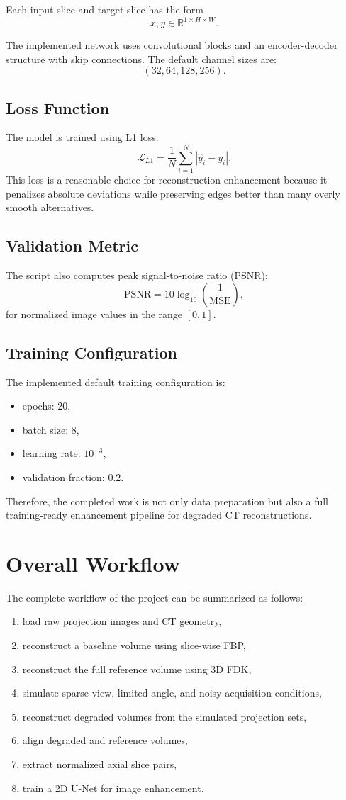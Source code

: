 \documentclass[12pt,a4paper]{article}
\begin{document}
Each input slice and target slice has the form
\[
x,y \in \mathbb{R}^{1\times H\times W}.
\]

The implemented network uses convolutional blocks and an encoder-decoder structure with skip connections. The default channel sizes are:
\[
(32, 64, 128, 256).
\]

\subsection{Loss Function}
The model is trained using L1 loss:
\[
\mathcal{L}_{L1} = \frac{1}{N}\sum_{i=1}^{N}\left|\hat{y}_i-y_i\right|.
\]
This loss is a reasonable choice for reconstruction enhancement because it penalizes absolute deviations while preserving edges better than many overly smooth alternatives.

\subsection{Validation Metric}
The script also computes peak signal-to-noise ratio (PSNR):
\[
\text{PSNR}=10\log_{10}\left(\frac{1}{\text{MSE}}\right),
\]
for normalized image values in the range $[0,1]$.

\subsection{Training Configuration}
The implemented default training configuration is:
\begin{itemize}[leftmargin=*]
\item epochs: 20,
\item batch size: 8,
\item learning rate: $10^{-3}$,
\item validation fraction: 0.2.
\end{itemize}

Therefore, the completed work is not only data preparation but also a full training-ready enhancement pipeline for degraded CT reconstructions.

\section{Overall Workflow}
The complete workflow of the project can be summarized as follows:
\begin{enumerate}[leftmargin=*]
\item load raw projection images and CT geometry,
\item reconstruct a baseline volume using slice-wise FBP,
\item reconstruct the full reference volume using 3D FDK,
\item simulate sparse-view, limited-angle, and noisy acquisition conditions,
\item reconstruct degraded volumes from the simulated projection sets,
\item align degraded and reference volumes,
\item extract normalized axial slice pairs,
\item train a 2D U-Net for image enhancement.
\end{enumerate}
\end{document}
